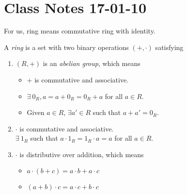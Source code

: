 \section{Class Notes 17-01-10}
For us, ring means commutative ring with identity.
\begin{definition}
A \emph{ring} is a set with two binary operations $(+,\cdot)$ satisfying
\begin{enumerate}
\item $(R,+)$ is an \emph{abelian group}, which means
\begin{itemize}
\item $+$ is commutative and associative.
\item $\exists\ 0_R, a=a+0_R=0_R+a$ for all $a\in R$.
\item Given $a\in R$, $\exists a'\in R$ such that $a+a'=0_R$.
\end{itemize}
\item 
$\cdot$ is commutative and associative.\\
$\exists\ 1_R$ such that $a\cdot 1_R=1_R\cdot a =a$ for all $a\in R$.
\item $\cdot$ is distributive over addition, which means
\begin{itemize}
\item $a\cdot(b+c) = a\cdot b+a\cdot c$
\item $(a+b)\cdot c = a\cdot c +b\cdot c$
\end{itemize}
\end{enumerate}
\end{definition}
